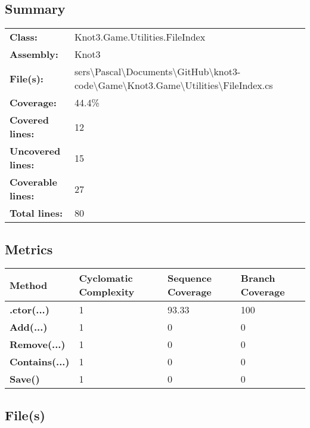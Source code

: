 \documentclass[a4paper,10pt]{article}
\begin{document}
\subsection{Summary}
\begin{longtable}[l]{ll}
\textbf{Class:} & Knot3.Game.Utilities.FileIndex\\
\textbf{Assembly:} & Knot3\\
\textbf{File(s):} & \begin{minipage}[t]{12cm}{sers\textbackslash Pascal\textbackslash Documents\textbackslash GitHub\textbackslash knot3-code\textbackslash Game\textbackslash Knot3.Game\textbackslash Utilities\textbackslash FileIndex.cs}\end{minipage} \\
\textbf{Coverage:} & 44.4\%\\
\textbf{Covered lines:} & 12\\
\textbf{Uncovered lines:} & 15\\
\textbf{Coverable lines:} & 27\\
\textbf{Total lines:} & 80\\
\end{longtable}
\subsection{Metrics}
\begin{longtable}[l]{|l|l|l|l|}
\hline
\textbf{Method} & \textbf{Cyclomatic Complexity} & \textbf{Sequence Coverage} & \textbf{Branch Coverage}\\
\hline
\textbf{.ctor(...)} & 1 & 93.33 & 100\\
\hline
\textbf{Add(...)} & 1 & 0 & 0\\
\hline
\textbf{Remove(...)} & 1 & 0 & 0\\
\hline
\textbf{Contains(...)} & 1 & 0 & 0\\
\hline
\textbf{Save()} & 1 & 0 & 0\\
\hline
\end{longtable}
\subsection{File(s)}
\end{document}
